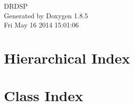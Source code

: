 \documentclass[twoside]{book}
\newcommand{\clearemptydoublepage}{%
  \newpage{\pagestyle{empty}\cleardoublepage}%
}
\begin{document}
\hypersetup{pageanchor=false}
\begin{titlepage}
\vspace*{7cm}
\begin{center}%
{\Large D\-R\-D\-S\-P }\\
\vspace*{1cm}
{\large Generated by Doxygen 1.8.5}\\
\vspace*{0.5cm}
{\small Fri May 16 2014 15:01:06}\\
\end{center}
\end{titlepage}
\clearemptydoublepage
\tableofcontents
\clearemptydoublepage
{}
\hypersetup{pageanchor=true}

\chapter{Hierarchical Index}

\chapter{Class Index}

\end{document}
